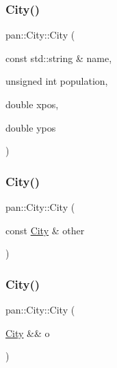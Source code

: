 \subsubsection{\texorpdfstring{City()}{City()}\hspace{0.1cm}{\footnotesize\ttfamily [3/5]}}
{\footnotesize\ttfamily pan\+::\+City\+::\+City (\begin{DoxyParamCaption}\item[{const std\+::string \&}]{name,  }\item[{unsigned int}]{population,  }\item[{double}]{xpos,  }\item[{double}]{ypos }\end{DoxyParamCaption})}

\mbox{\label{classpan_1_1_city_ae7eeaa8d62dc361a7ad7be657cc41e69}} 
\subsubsection{\texorpdfstring{City()}{City()}\hspace{0.1cm}{\footnotesize\ttfamily [4/5]}}
{\footnotesize\ttfamily pan\+::\+City\+::\+City (\begin{DoxyParamCaption}\item[{const \hyperlink{classpan_1_1_city}{City} \&}]{other }\end{DoxyParamCaption})}

\mbox{\label{classpan_1_1_city_a77b79e8d2ae5e9fa6ae37d290c87df2f}} 
\subsubsection{\texorpdfstring{City()}{City()}\hspace{0.1cm}{\footnotesize\ttfamily [5/5]}}
{\footnotesize\ttfamily pan\+::\+City\+::\+City (\begin{DoxyParamCaption}\item[{\hyperlink{classpan_1_1_city}{City} \&\&}]{o }\end{DoxyParamCaption})}

\mbox{\label{classpan_1_1_city_a5cec0ac09c157ca262c61a1fbb7debf3}} 
